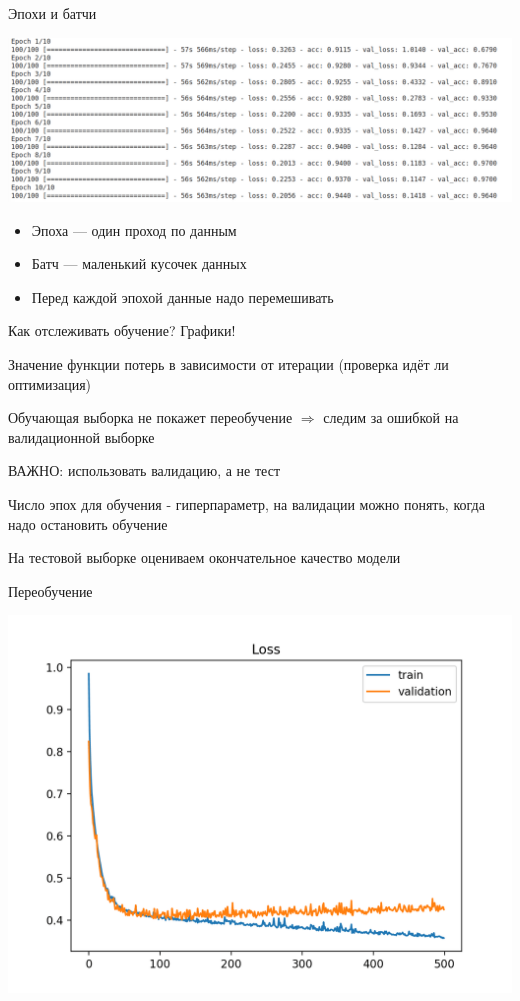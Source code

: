 \documentclass[notes,12pt, aspectratio=169]{beamer}
\newenvironment{wideitemize}{\itemize\addtolength{\itemsep}{10pt}}{\enditemize}
\begin{document}
\begin{frame}{Эпохи и батчи}
	\begin{center}
		\includegraphics[width=.95\linewidth]{epoch_batch.png}
	\end{center}
	\begin{itemize}
		\item \alert{Эпоха} — один проход по данным 
		\item \alert{Батч} — маленький кусочек данных
		\item \alert{Перед каждой эпохой данные надо перемешивать}
	\end{itemize}
\end{frame}


\begin{frame}{Как отслеживать обучение? Графики!}
\begin{wideitemize}
	\item Значение функции потерь в зависимости от итерации (проверка идёт ли оптимизация)
	
	\item Обучающая выборка не покажет переобучение $\Rightarrow$ следим за ошибкой на валидационной выборке
	
	\item \alert{ВАЖНО:}  использовать валидацию, а не тест
	
	\item Число эпох для обучения - гиперпараметр, на валидации можно понять, когда надо остановить обучение
	
	\item На тестовой выборке оцениваем окончательное качество модели	
\end{wideitemize}
\end{frame}


\begin{frame}{Переобучение}
\begin{center}
	\includegraphics[width=.7\linewidth]{overfitting.png}
\end{center}
\end{frame}
\end{document}
